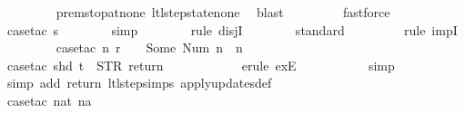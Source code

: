 \begin{isabellebody}
\ \ \ \ \ \ \ \isamarkupfalse%
\ prem{\isacharunderscore}stop{\isacharunderscore}at{\isacharunderscore}none\ ltl{\isacharunderscore}step{\isacharunderscore}state{\isacharunderscore}none\ \isamarkupfalse%
\ blast\isanewline
\ \ \ \ \ \ \ \isamarkupfalse%
\ fastforce\isanewline
\isanewline
\ \ \ \ \ \isamarkupfalse%
\ {\isacharparenleft}case{\isacharunderscore}tac\ {\isachardoublequoteopen}s{\isacharequal}{}{\isachardoublequoteclose}{\isacharparenright}\isanewline
\ \ \ \ \ \ \isamarkupfalse%
\ simp\isanewline
\ \ \ \ \ \ \isamarkupfalse%
\ {\isacharparenleft}rule\ disjI{}{\isacharparenright}{\isacharplus}\isanewline
\ \ \ \ \ \ \isamarkupfalse%
\ standard\isanewline
\ \ \ \ \ \ \ \isamarkupfalse%
\ {\isacharparenleft}rule\ impI{\isacharparenright}\isanewline
\ \ \ \ \ \ \ \isamarkupfalse%
\ {\isacharparenleft}case{\isacharunderscore}tac\ {\isachardoublequoteopen}{\isasymexists}n{\isachardot}\ r\ {\isachardollar}\ {}\ {\isacharequal}\ Some\ {\isacharparenleft}Num\ n{\isacharparenright}\ {\isasymand}\ n\ {\isasymin}\ {\isacharbraceleft}{}{\isacharcomma}\ {}{\isacharcomma}\ {}{\isacharcomma}\ {}{\isacharbraceright}{\isachardoublequoteclose}{\isacharparenright}\isanewline
\ \ \ \ \ \ \ \ \isamarkupfalse%
\ {\isacharparenleft}case{\isacharunderscore}tac\ {\isachardoublequoteopen}shd\ t\ {\isacharequal}\ {\isacharparenleft}STR\ {\isacharprime}{\isacharprime}return{\isacharprime}{\isacharprime}{\isacharcomma}\ {\isacharbrackleft}{\isacharbrackright}{\isacharparenright}{\isachardoublequoteclose}{\isacharparenright}\isanewline
\ \ \ \ \ \ \ \ \ \isamarkupfalse%
\ {\isacharparenleft}erule\ exE{\isacharparenright}\isanewline
\ \ \ \ \ \ \ \ \ \isamarkupfalse%
\ simp\isanewline
\ \ \ \ \ \ \ \ \ \isamarkupfalse%
\ {\isacharparenleft}simp\ add{\isacharcolon}\ return\ ltl{\isacharunderscore}step{\isachardot}simps\ apply{\isacharunderscore}updates{\isacharunderscore}def{\isacharparenright}\isanewline
\ \ \ \ \ \ \ \ \ \isamarkupfalse%
\ {\isacharparenleft}case{\isacharunderscore}tac\ {\isachardoublequoteopen}nat\ na\ {\isasymin}\ {\isacharbraceleft}{}{\isacharcomma}\ {}{\isacharcomma}\ {}{\isacharcomma}\ {}{\isacharbraceright}{\isachardoublequoteclose}{\isacharparenright}\isanewline
\ \ \ \ \ \ \ \ \ \ \isamarkupfalse%

\end{isabellebody}
